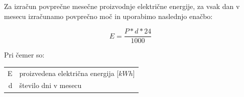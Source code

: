 Za izračun povprečne mesečne proizvodnje električne energije, za vsak dan v mesecu izračunamo povprečno moč in uporabimo naslednjo enačbo:

\begin{equation}
E = \dfrac{P * d * 24}{1000}
\end{equation}

Pri čemer so:
\begin{table}[htb!]
\begin{tabular}{r|p{10cm}}
	E & proizvedena električna energija [$kWh$]\\
	d & število dni v mesecu \\
\end{tabular}
\end{table}

